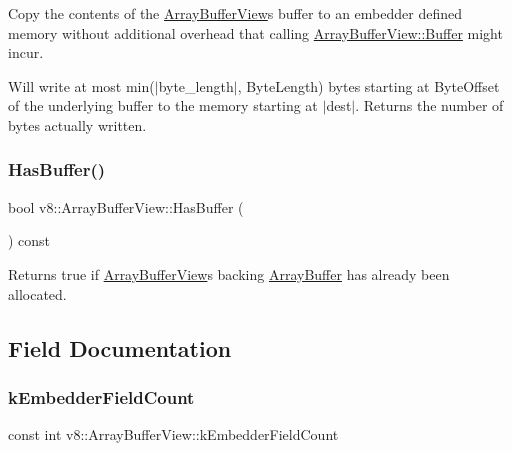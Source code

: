 Copy the contents of the \mbox{\hyperlink{classv8_1_1ArrayBufferView}{Array\+Buffer\+View}}\textquotesingle{}s buffer to an embedder defined memory without additional overhead that calling \mbox{\hyperlink{classv8_1_1ArrayBufferView_a2ceba3908fbf98ecc81702083127b046}{Array\+Buffer\+View\+::\+Buffer}} might incur.

Will write at most min($\vert$byte\+\_\+length$\vert$, Byte\+Length) bytes starting at Byte\+Offset of the underlying buffer to the memory starting at $\vert$dest$\vert$. Returns the number of bytes actually written. \mbox{\label{classv8_1_1ArrayBufferView_ab1f5835c3dea53a625814a8c3ab2e0ae}} 
\subsubsection{\texorpdfstring{Has\+Buffer()}{HasBuffer()}}
{\footnotesize\ttfamily bool v8\+::\+Array\+Buffer\+View\+::\+Has\+Buffer (\begin{DoxyParamCaption}{ }\end{DoxyParamCaption}) const}

Returns true if \mbox{\hyperlink{classv8_1_1ArrayBufferView}{Array\+Buffer\+View}}\textquotesingle{}s backing \mbox{\hyperlink{classv8_1_1ArrayBuffer}{Array\+Buffer}} has already been allocated. 

\subsection{Field Documentation}
\mbox{\label{classv8_1_1ArrayBufferView_a4c007c4f644125cee1b7605c9ea1bc6c}} 
\subsubsection{\texorpdfstring{k\+Embedder\+Field\+Count}{kEmbedderFieldCount}}
{\footnotesize\ttfamily const int v8\+::\+Array\+Buffer\+View\+::k\+Embedder\+Field\+Count\hspace{0.3cm}{\ttfamily [static]}}

